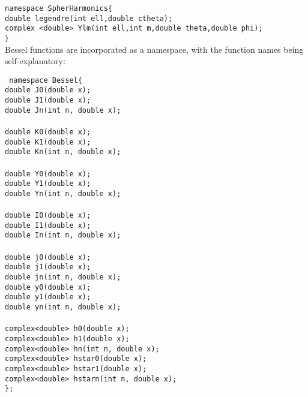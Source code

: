 \documentclass[10pt]{article}
\def\tab{\hspace*{9pt}}
\begin{document}
{\tt namespace SpherHarmonics\{\\
\tab double legendre(int ell,double ctheta);\\
\tab complex <double> Ylm(int ell,int m,double theta,double phi);\\
\}}\\

Bessel functions are incorporated as a namespace, with the function names being self-explanatory:

{\tt
namespace Bessel\{\\
\tab double J0(double x);\\
\tab double J1(double x);\\
\tab double Jn(int n, double x);\\
\\
\tab double K0(double x);\\
\tab double K1(double x);\\
\tab double Kn(int n, double x);\\
\\
\tab double Y0(double x);\\
\tab double Y1(double x);\\
\tab double Yn(int n, double x);\\
\\
\tab double I0(double x);\\
\tab double I1(double x);\\
\tab double In(int n, double x);\\
\\
\tab double j0(double x);\\
\tab double j1(double x);\\
\tab double jn(int n, double x);\\

\tab double y0(double x);\\
\tab double y1(double x);\\
\tab double yn(int n, double x);\\
\\
\tab complex<double> h0(double x);\\
\tab complex<double> h1(double x);\\
\tab complex<double> hn(int n, double x);\\

\tab complex<double> hstar0(double x);\\
\tab complex<double> hstar1(double x);\\
\tab complex<double> hstarn(int n, double x);\\
\};}\\
\end{document}
